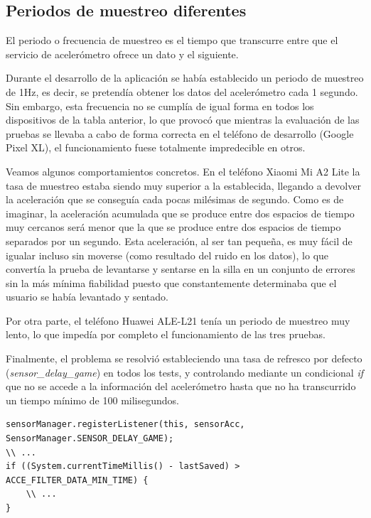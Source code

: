 \subsection{Periodos de muestreo diferentes}

El periodo o frecuencia de muestreo es el tiempo que transcurre entre que el servicio de acelerómetro ofrece un dato y el siguiente. 

Durante el desarrollo de la aplicación se había establecido un periodo de muestreo de 1Hz, es decir, se pretendía obtener los datos del acelerómetro cada 1 segundo. Sin embargo, esta frecuencia no se cumplía de igual forma en todos los dispositivos de la tabla anterior, lo que provocó que mientras la evaluación de las pruebas se llevaba a cabo de forma correcta en el teléfono de desarrollo (Google Pixel XL), el funcionamiento fuese totalmente impredecible en otros.

Veamos algunos comportamientos concretos. En el teléfono Xiaomi Mi A2 Lite la tasa de muestreo estaba siendo muy superior a la establecida, llegando a devolver la aceleración que se conseguía cada pocas milésimas de segundo. Como es de imaginar, la aceleración acumulada que se produce entre dos espacios de tiempo muy cercanos será menor que la que se produce entre dos espacios de tiempo separados por un segundo. Esta aceleración, al ser tan pequeña, es muy fácil de igualar incluso sin moverse (como resultado del ruido en los datos), lo que convertía la prueba de levantarse y sentarse en la silla en un conjunto de errores sin la más mínima fiabilidad puesto que constantemente determinaba que el usuario se había levantado y sentado.

Por otra parte, el teléfono Huawei ALE-L21 tenía un periodo de muestreo muy lento, lo que impedía por completo el funcionamiento de las tres pruebas. 

Finalmente, el problema se resolvió estableciendo una tasa de refresco por defecto (\textit{sensor\_delay\_game}) en todos los tests, y controlando mediante un condicional \textit{if} que no se accede a la información del acelerómetro hasta que no ha transcurrido un tiempo mínimo de 100 milisegundos. 

\begin{lstlisting}
sensorManager.registerListener(this, sensorAcc, SensorManager.SENSOR_DELAY_GAME);
\\ ...
if ((System.currentTimeMillis() - lastSaved) > ACCE_FILTER_DATA_MIN_TIME) {
    \\ ... 
}
\end{lstlisting}

